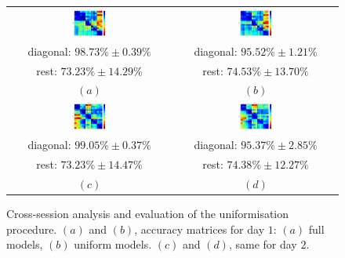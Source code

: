 \begin{figure}[!ht] \centering
  \begin{tabular}{cc}
    \includegraphics[width=0.22\textwidth]{figs/fig_resCross1_full} &
    \includegraphics[width=0.22\textwidth]{figs/fig_resCross1} \\
    diagonal: $98.73\% \pm 0.39\%$  & diagonal: $95.52\% \pm 1.21\%$ \\
        rest: $73.23\% \pm 14.29\%$ & rest: $74.53\% \pm 13.70\%$ \\
    $(a)$ & $(b)$ \\
    \includegraphics[width=0.22\textwidth]{figs/fig_resCross2_full} &
    \includegraphics[width=0.22\textwidth]{figs/fig_resCross2} \\
    diagonal: $99.05\% \pm 0.37\%$ & diagonal: $95.37\% \pm 2.85\%$ \\
        rest: $73.23\% \pm 14.47\%$ & rest: $74.38\% \pm 12.27\%$ \\
    $(c)$ & $(d)$ \\
  \end{tabular}
  \caption{Cross-session analysis and evaluation of the uniformisation
    procedure. $(a)$ and $(b)$, accuracy matrices for day $1$: $(a)$
    full models, $(b)$ uniform models. $(c)$ and $(d)$, same for day $2$.}
  \label{fig:cross_initial}
\end{figure}


